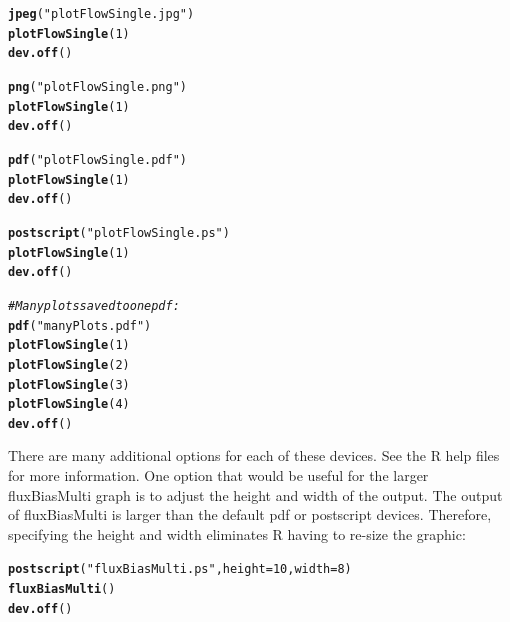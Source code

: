 \documentclass[a4paper,11pt]{article}\usepackage[]{graphicx}\usepackage[]{color}
\makeatletter
\newcommand{\hlnum}[1]{\textcolor[rgb]{0.686,0.059,0.569}{#1}}%
\newcommand{\hlstr}[1]{\textcolor[rgb]{0.192,0.494,0.8}{#1}}%
\newcommand{\hlcom}[1]{\textcolor[rgb]{0.678,0.584,0.686}{\textit{#1}}}%
\newcommand{\hlstd}[1]{\textcolor[rgb]{0.345,0.345,0.345}{#1}}%
\newcommand{\hlkwc}[1]{\textcolor[rgb]{0.333,0.667,0.333}{#1}}%
\newcommand{\hlkwd}[1]{\textcolor[rgb]{0.737,0.353,0.396}{\textbf{#1}}}%
\newenvironment{kframe}{%
 \def\at@end@of@kframe{}%
 \ifinner\ifhmode%
  \def\at@end@of@kframe{\end{minipage}}%
  \begin{minipage}{\columnwidth}%
 \fi\fi%
 \def\FrameCommand##1{\hskip\@totalleftmargin \hskip-\fboxsep
 \colorbox{shadecolor}{##1}\hskip-\fboxsep
     \hskip-\linewidth \hskip-\@totalleftmargin \hskip\columnwidth}%
 \MakeFramed {\advance\hsize-\width
   \@totalleftmargin\z@ \linewidth\hsize
   \@setminipage}}%
 {\par\unskip\endMakeFramed%
 \at@end@of@kframe}
\newenvironment{knitrout}{}{} %
\makeatother
\begin{document}
\begin{knitrout}
\color{fgcolor}\begin{kframe}
\begin{alltt}
\hlkwd{jpeg}\hlstd{(}\hlstr{"plotFlowSingle.jpg"}\hlstd{)}
\hlkwd{plotFlowSingle}\hlstd{(}\hlnum{1}\hlstd{)}
\hlkwd{dev.off}\hlstd{()}

\hlkwd{png}\hlstd{(}\hlstr{"plotFlowSingle.png"}\hlstd{)}
\hlkwd{plotFlowSingle}\hlstd{(}\hlnum{1}\hlstd{)}
\hlkwd{dev.off}\hlstd{()}

\hlkwd{pdf}\hlstd{(}\hlstr{"plotFlowSingle.pdf"}\hlstd{)}
\hlkwd{plotFlowSingle}\hlstd{(}\hlnum{1}\hlstd{)}
\hlkwd{dev.off}\hlstd{()}

\hlkwd{postscript}\hlstd{(}\hlstr{"plotFlowSingle.ps"}\hlstd{)}
\hlkwd{plotFlowSingle}\hlstd{(}\hlnum{1}\hlstd{)}
\hlkwd{dev.off}\hlstd{()}

\hlcom{#Many plots saved to one pdf:}
\hlkwd{pdf}\hlstd{(}\hlstr{"manyPlots.pdf"}\hlstd{)}
\hlkwd{plotFlowSingle}\hlstd{(}\hlnum{1}\hlstd{)}
\hlkwd{plotFlowSingle}\hlstd{(}\hlnum{2}\hlstd{)}
\hlkwd{plotFlowSingle}\hlstd{(}\hlnum{3}\hlstd{)}
\hlkwd{plotFlowSingle}\hlstd{(}\hlnum{4}\hlstd{)}
\hlkwd{dev.off}\hlstd{()}
\end{alltt}
\end{kframe}
\end{knitrout}

There are many additional options for each of these devices. See the R help files for more information. One option that would be useful for the larger fluxBiasMulti graph is to adjust the height and width of the output. The output of fluxBiasMulti is larger than the default pdf or postscript devices. Therefore, specifying the height and width eliminates R having to re-size the graphic:

\begin{knitrout}
\color{fgcolor}\begin{kframe}
\begin{alltt}
\hlkwd{postscript}\hlstd{(}\hlstr{"fluxBiasMulti.ps"}\hlstd{,} \hlkwc{height}\hlstd{=}\hlnum{10}\hlstd{,}\hlkwc{width}\hlstd{=}\hlnum{8}\hlstd{)}
\hlkwd{fluxBiasMulti}\hlstd{()}
\hlkwd{dev.off}\hlstd{()}
\end{alltt}
\end{kframe}
\end{knitrout}
\end{document}

